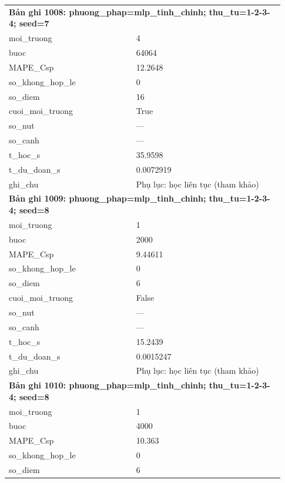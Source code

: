 \begin{longtable}{p{0.43\linewidth}p{0.50\linewidth}}
\midrule
\multicolumn{2}{p{0.95\linewidth}}{\textbf{Bản ghi 1008: phuong\_phap=mlp\_tinh\_chinh; thu\_tu=1-2-3-4; seed=7}} \\
moi\_\allowbreak truong & 4 \\
buoc & 64064 \\
MAPE\_\allowbreak Csp & 12.2648 \\
so\_\allowbreak khong\_\allowbreak hop\_\allowbreak le & 0 \\
so\_\allowbreak diem & 16 \\
cuoi\_\allowbreak moi\_\allowbreak truong & True \\
so\_\allowbreak nut & — \\
so\_\allowbreak canh & — \\
t\_\allowbreak hoc\_\allowbreak s & 35.9598 \\
t\_\allowbreak du\_\allowbreak doan\_\allowbreak s & 0.0072919 \\
ghi\_\allowbreak chu & Phụ lục: học liên tục (tham khảo) \\
\midrule
\multicolumn{2}{p{0.95\linewidth}}{\textbf{Bản ghi 1009: phuong\_phap=mlp\_tinh\_chinh; thu\_tu=1-2-3-4; seed=8}} \\
moi\_\allowbreak truong & 1 \\
buoc & 2000 \\
MAPE\_\allowbreak Csp & 9.44611 \\
so\_\allowbreak khong\_\allowbreak hop\_\allowbreak le & 0 \\
so\_\allowbreak diem & 6 \\
cuoi\_\allowbreak moi\_\allowbreak truong & False \\
so\_\allowbreak nut & — \\
so\_\allowbreak canh & — \\
t\_\allowbreak hoc\_\allowbreak s & 15.2439 \\
t\_\allowbreak du\_\allowbreak doan\_\allowbreak s & 0.0015247 \\
ghi\_\allowbreak chu & Phụ lục: học liên tục (tham khảo) \\
\midrule
\multicolumn{2}{p{0.95\linewidth}}{\textbf{Bản ghi 1010: phuong\_phap=mlp\_tinh\_chinh; thu\_tu=1-2-3-4; seed=8}} \\
moi\_\allowbreak truong & 1 \\
buoc & 4000 \\
MAPE\_\allowbreak Csp & 10.363 \\
so\_\allowbreak khong\_\allowbreak hop\_\allowbreak le & 0 \\
so\_\allowbreak diem & 6 \\

\end{longtable}
